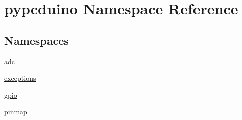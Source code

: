 \hypertarget{namespacepypcduino}{\section{pypcduino Namespace Reference}
\label{namespacepypcduino}
}
\subsection*{Namespaces}
\begin{DoxyCompactItemize}
\item 
\hyperlink{namespacepypcduino_1_1adc}{adc}
\item 
\hyperlink{namespacepypcduino_1_1exceptions}{exceptions}
\item 
\hyperlink{namespacepypcduino_1_1gpio}{gpio}
\item 
\hyperlink{namespacepypcduino_1_1pinmap}{pinmap}
\end{DoxyCompactItemize}
